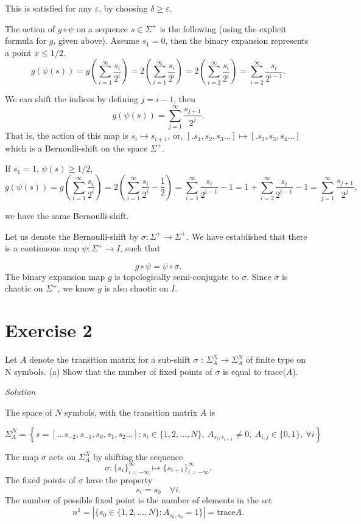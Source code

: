 \documentclass[a4paper,11pt,pdftex]{article}
\begin{document}
This is satisfied for any $\varepsilon$, by choosing $\delta \geq \varepsilon$. 

The action of $g\circ \psi$ on a sequence $s\in \Sigma^+$ is  the following (using the explicit formula for $g$, given above).
Assume $s_1 = 0$, then the binary expansion represents a point $x\leq 1/2.$
$$
g(\psi(s)) = g\left( \sum_{i=1}^\infty \frac{s_i}{2^i} \right) = 2\left( \sum_{i=1}^\infty \frac{s_i}{2^i} \right) = 2\left( \sum_{i=2}^\infty \frac{s_i}{2^i} \right) =  \sum_{i=2}^\infty \frac{s_i}{2^{i-1}}.
$$

We can shift the indices by defining $j = i-1$, then
$$
g(\psi(s)) = \sum_{j=1}^\infty \frac{s_{j+1}}{2^{j}}.
$$
That is, the action of this map is $s_i \mapsto s_{i+1}$, or,  $[.s_1,s_2,s_3 \dots]\mapsto [.s_2,s_3,s_4 \dots]$ which is a Bernoulli-shift on the space $\Sigma^+$.

If $s_1 = 1$, $\psi(s)\geq 1/2$, 
$$
g(\psi(s)) = g\left( \sum_{i=1}^\infty \frac{s_i}{2^i} \right) = 2\left( \sum_{i=1}^\infty \frac{s_i}{2^i} -\frac{1}{2}\right) = \sum_{i=1}^\infty \frac{s_i}{2^{i-1}} - 1 = 1 + \sum_{i=2}^\infty \frac{s_i}{2^{i-1}} - 1 = \sum_{j=1}^\infty \frac{s_{j+1}}{2^{j}},
$$
 
 we have the same Bernoulli-shift. 
 
Let us denote the Bernoulli-shift by $\sigma : \Sigma^+ \to \Sigma^+$. We have established that there is a continuous map $\psi: \Sigma^+ \to I$, such that

$$
g \circ \psi = \psi \circ \sigma.
$$
The binary expansion map $g$ is topologically semi-conjugate to $\sigma$. Since $\sigma$ is chaotic on $\Sigma^+$, we know $g$ is also chaotic on $I$. 
\section*{Exercise 2}
Let $A$ denote the transition matrix for a sub-shift $\sigma$ : $\Sigma^N_A \to \Sigma^N_A$ of finite type on N symbols.
(a) Show that the number of fixed points of $\sigma$ is equal to trace($A$).

\emph{Solution}

The space of $N$ symbols, with the transition matrix $A$ is 

$$
\Sigma_A^N = \left\{ s = [\dots s_{-2}, s_{-1}, s_0, s_1, s_2 \dots]: s_i \in \{1, 2, \dots, N\},\  A_{s_i, s_{i+1}}\ne 0,\ A_{i,j}\in \{0,1\},\  \forall i \right\}
$$

The map $\sigma$ acts on $\Sigma_A^N$ by shifting the sequence
$$
\sigma: \{s_i\}_{i=-\infty}^{\infty} \mapsto \{s_{i+1}\}_{i=-\infty}^{\infty}.
$$
The fixed points of $\sigma$ have the property 
$$
s_i = s_0 \quad \forall i.
$$
The number of possible fixed point is the number of elements in the set
$$
n^1 = |\{ s_0\in \{ 1, 2, ..., N\}: A_{s_0, s_0} = 1\}| = \text{trace} A. 
$$
\end{document}
